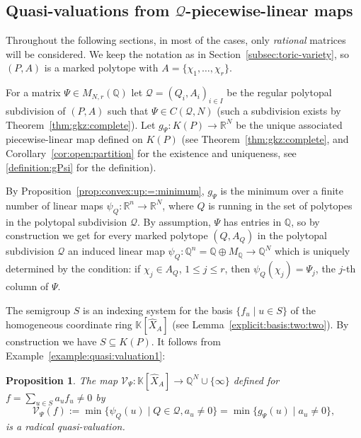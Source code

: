 \documentclass[12pt, a4article]{amsart}   	%
\numberwithin{equation}{section}
\theoremstyle{plain}
\newtheorem{proposition}[theorem]{Proposition}
\theoremstyle{definition}
\begin{document}
\subsection{Quasi-valuations from $\mathcal{Q}$-piecewise-linear maps}\label{quasi-valuation:one}

Throughout the following sections, in most of the cases, only \emph{rational} matrices will be considered. We keep the notation as in Section~\ref{subsec:toric-variety}, so $(P,A)$ is a marked polytope with $A=\{\chi_1,\ldots,\chi_r\}$. 

For a matrix $\Psi\in M_{N,r}(\mathbb Q)$ let $\mathcal Q=(Q_i,A_i)_{i\in I}$ be the regular polytopal subdivision of $(P,A)$ such that $\Psi\in C(\mathcal Q,N)$ (such a subdivision exists by Theorem~\ref{thm:gkz:complete}). Let $g_{\Psi}:K(P)\rightarrow \mathbb R^N$ be the unique associated piecewise-linear map defined on $K(P)$ (see Theorem~\ref{thm:gkz:complete}, and Corollary~\ref{cor:open:partition}
for the existence and uniqueness, see \eqref{definition:gPsi} for the definition).

By Proposition~\ref{prop:convex:up:=:minimum}, $g_{\Psi}$ is the minimum
over a finite number of linear maps $\psi_Q:\mathbb R^n\rightarrow \mathbb R^N$, where $Q$ is running in the set of polytopes in the polytopal subdivision $\mathcal Q$. By assumption, $\Psi$ has entries in $\mathbb{Q}$, so by construction
we get for every marked polytope $(Q,A_Q)$ in the polytopal subdivision $\mathcal Q$ an induced linear map $\psi_Q:\mathbb Q^n=\mathbb Q\oplus M_\mathbb Q\rightarrow \mathbb Q^N$ which is uniquely determined by the condition: if $\chi_j\in A_Q$, $1\le j\le r$, then $\psi_Q(\chi_j)=\Psi_j$, the $j$-th column of $\Psi$.

The semigroup $S$ is an indexing system for the  basis $\{f_{u}\mid u\in S \}$ of the homogeneous coordinate ring $\mathbb K[\hat X_A]$ (see Lemma~\ref{explicit:basis:two:two}). By construction we have $S\subseteq K(P)$. It follows from Example~\ref{example:quasi:valuation1}:

\begin{proposition}\label{proposition:quasi:valuation}
The map $\mathcal V_\Psi: \mathbb K[\hat X_A]\rightarrow \mathbb Q^N\cup\{\infty\}$ defined  for $f=\sum_{u\in S} a_{u}f_{u}\neq 0$ by  
\begin{equation}\label{quasi-one}
\mathcal V_\Psi(f):= \min\{\psi_Q(u)\mid Q\in\mathcal Q,  a_{u}\not=0\}= \min\{g_{\Psi}(u)\mid  a_{u}\not=0\},
\end{equation}
is a radical quasi-valuation.
\end{proposition}
\end{document}
